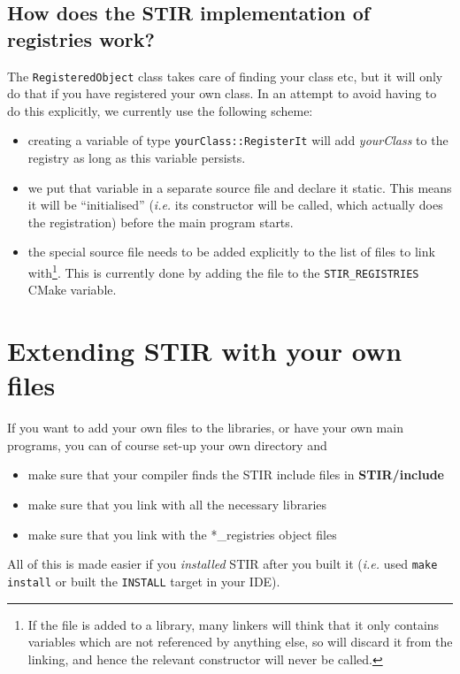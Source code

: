 \documentclass{article}
\begin{document}
\subsection{How does the STIR implementation of registries work?}
The \texttt{RegisteredObject} class takes care of finding your class etc, but it
will only do that if you have registered your own class. In an attempt to 
avoid having to do this explicitly, we currently use the following scheme:
\begin{itemize}
\item creating a variable of type \texttt{yourClass::RegisterIt} will add \textit{yourClass}
to the registry as long as this variable persists.
\item we put that variable in a separate source file and declare it static. This means it
will be ``initialised'' (\textit{i.e.} its constructor will be called, which actually does the
registration) before the main program starts.
\item the special source file needs to be added explicitly to the list of files to link with\footnote{
If the file is added to a library, many linkers will think that it only contains variables which are
not referenced by anything else, so will discard it from the linking, and hence the relevant 
constructor will never be called.}. This is currently done by adding the file to the 
\texttt{STIR\_REGISTRIES} CMake variable.
\end{itemize}

\section{
Extending STIR with your own files \label{sect:extendingSTIR}}

If you want to add your own files to the libraries, or have your 
own main programs, you can of course set-up your own directory 
and
\begin{itemize}
\item 
make sure that your compiler finds the STIR include files in \textbf{STIR/include}
\item 
make sure that you link with all the necessary libraries
\item 
make sure that you link with the *\_registries object files
\end{itemize}

All of this is made easier if you  \textit{installed}
STIR after you built it (\textit{i.e.} used \texttt{make install} or built the \texttt{INSTALL}
target in your IDE).
\end{document}
